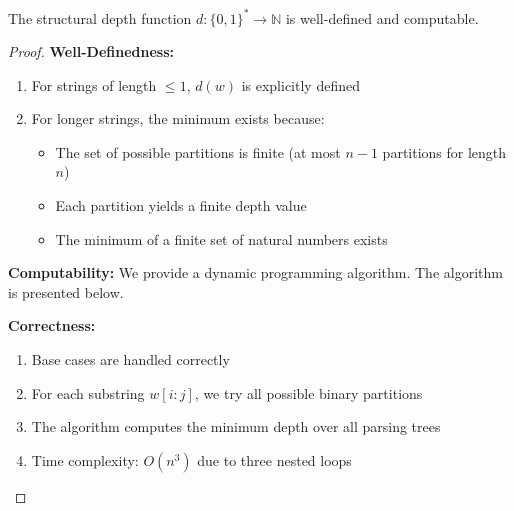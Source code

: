   \begin{lemma}
  The structural depth function $d: \{0,1\}^* \to \mathbb{N}$ is well-defined and computable.
  \end{lemma}
  
  \begin{proof}
  \textbf{Well-Definedness:}
  \begin{enumerate}
  \item For strings of length $\leq 1$, $d(w)$ is explicitly defined
  \item For longer strings, the minimum exists because:
    \begin{itemize}
    \item The set of possible partitions is finite (at most $n-1$ partitions for length $n$)
    \item Each partition yields a finite depth value
    \item The minimum of a finite set of natural numbers exists
    \end{itemize}
  \end{enumerate}
  
  \textbf{Computability:}
  We provide a dynamic programming algorithm. The algorithm is presented below.
  
  \textbf{Correctness:}
  \begin{enumerate}
  \item Base cases are handled correctly
  \item For each substring $w[i:j]$, we try all possible binary partitions
  \item The algorithm computes the minimum depth over all parsing trees
  \item Time complexity: $O(n^3)$ due to three nested loops
  \end{enumerate}
  \end{proof}
  
